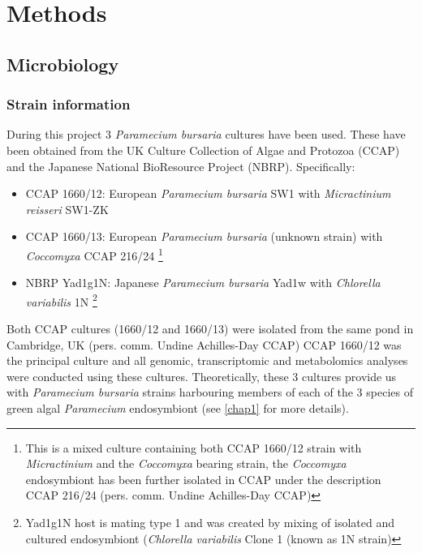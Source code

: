 \graphicspath{{chapters/2.Methods/figures}}

\chapter{Methods}

\section{Microbiology}
\subsection{Strain information}
During this project 3 \textit{Paramecium bursaria} cultures have been used.  These have been obtained from 
the UK Culture Collection of Algae and Protozoa (CCAP) and the Japanese National BioResource Project (NBRP).
Specifically:
\begin{itemize}
    \item CCAP 1660/12: European \textit{Paramecium bursaria} SW1 with \textit{Micractinium reisseri} SW1-ZK \citep{Hoshina2010}
    \item CCAP 1660/13: European \textit{Paramecium bursaria} (unknown strain) with \textit{Coccomyxa} CCAP 216/24 \footnote{This is a mixed culture 
            containing both CCAP 1660/12 strain with \textit{Micractinium} and the \textit{Coccomyxa} bearing strain, 
        the \textit{Coccomyxa} endosymbiont has been further isolated in CCAP under the description CCAP 216/24 (pers. comm. Undine Achilles-Day CCAP)}
    \item NBRP Yad1g1N: Japanese \textit{Paramecium bursaria} Yad1w with \textit{Chlorella variabilis} 1N \footnote{
        Yad1g1N host is mating type 1 and was created by mixing of isolated and 
        cultured endosymbiont (\textit{Chlorella variabilis} Clone 1 (known as 1N strain)
        }
\end{itemize}

Both CCAP cultures (1660/12 and 1660/13) were isolated from the same pond in Cambridge, UK (pers. comm. Undine Achilles-Day CCAP)
CCAP 1660/12 was the principal culture and all genomic, transcriptomic and metabolomics analyses were conducted using these cultures. 
Theoretically, these 3 cultures provide us with \textit{Paramecium bursaria} strains harbouring members of each of the 3 species of 
green algal \textit{Paramecium} endosymbiont (see \ref{chap1} for more details).

